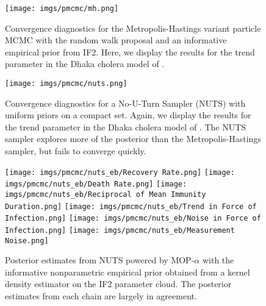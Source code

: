 
\begin{figure}[H]
    \centering
    \texttt{[image: imgs/pmcmc/mh.png]}
    \caption{Convergence diagnostics for the Metropolis-Hastings variant particle MCMC with the random walk proposal and an informative empirical prior from IF2. Here, we display the results for the trend parameter in the Dhaka cholera model of \cite{king08}.}
    \label{fig:mh}
\end{figure}


\begin{figure}[H]
    \centering
    \texttt{[image: imgs/pmcmc/nuts.png]}
    \caption{Convergence diagnostics for a No-U-Turn Sampler (NUTS) with uniform priors on a compact set. Again, we display the results for the trend parameter in the Dhaka cholera model of \cite{king08}. The NUTS sampler explores more of the posterior than the Metropolis-Hastings sampler, but fails to converge quickly.}
    \label{fig:nuts}
\end{figure}


\begin{figure}[H]
    \centering
    \texttt{[image: imgs/pmcmc/nuts\_eb/Recovery Rate.png]}
    \texttt{[image: imgs/pmcmc/nuts\_eb/Death Rate.png]}
    \texttt{[image: imgs/pmcmc/nuts\_eb/Reciprocal of Mean Immunity Duration.png]}
    \texttt{[image: imgs/pmcmc/nuts\_eb/Trend in Force of Infection.png]}
    \texttt{[image: imgs/pmcmc/nuts\_eb/Noise in Force of Infection.png]}
    \texttt{[image: imgs/pmcmc/nuts\_eb/Measurement Noise.png]}
    \caption{Posterior estimates from NUTS powered by MOP-$\alpha$ with the informative nonparametric empirical prior obtained from a kernel density estimator on the IF2 parameter cloud. The posterior estimates from each chain are largely in agreement.}
    \label{fig:posteriors}
\end{figure}

